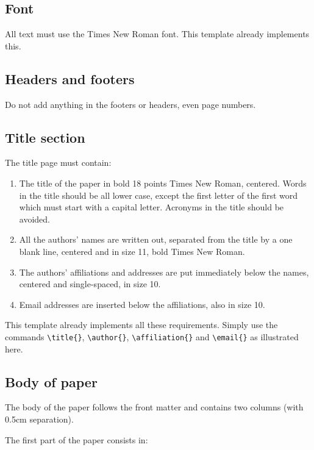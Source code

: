 \documentclass[a4paper, times, 10pt, twocolumn, twoside]{article}
\begin{document}
\subsection{Font}

All text must use the Times New Roman font.
This  template already implements this. 

\subsection{Headers and footers}

Do not add anything in the footers or headers, even page numbers.

\subsection{Title section}

The title page must contain:
\begin{enumerate}[noitemsep]
\item
The title of the paper in bold 18 points Times New Roman, centered. Words in the title should be all lower case, except the first letter of the first word which must start with a capital letter. Acronyms in the title should be avoided.
\item
All the authors' names are written out, separated from the title by a one blank line, centered and in size 11, bold Times New Roman.
\item
The authors' affiliations and addresses are put immediately below the names, centered and single-spaced, in size 10.
\item
Email addresses are inserted below the affiliations, also in size 10.
\end{enumerate}
%
This template already implements all these requirements. Simply use the commands \verb|\title{}|, \verb|\author{}|, \verb|\affiliation{}| and \verb|\email{}| as illustrated here.

\subsection{Body of paper}

The body of the paper follows the front matter and contains two columns (with 0.5cm separation).

The first part of the paper consists in:
\end{document}
